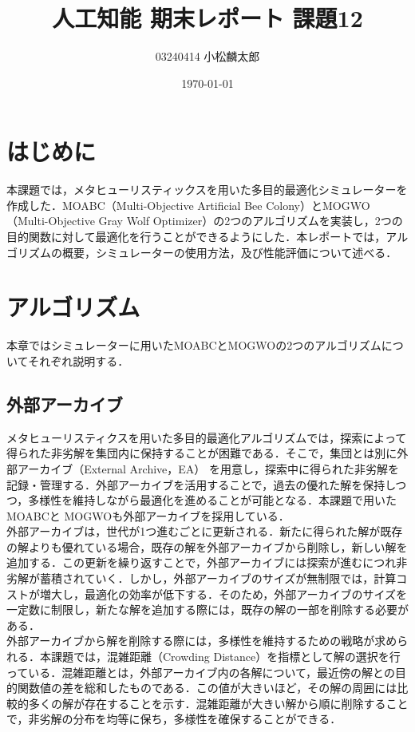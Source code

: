 \documentclass[a4paper, twocolumn]{ltjsarticle}
\title{人工知能 期末レポート 課題12}
\author{03240414  小松麟太郎}
\date{\today}
\begin{document}
\maketitle

\section{はじめに}
本課題では，メタヒューリスティックスを用いた多目的最適化シミュレーターを作成した．MOABC（Multi-Objective Artificial Bee Colony）とMOGWO（Multi-Objective Gray Wolf Optimizer）の2つのアルゴリズムを実装し，2つの目的関数に対して最適化を行うことができるようにした．本レポートでは，アルゴリズムの概要，シミュレーターの使用方法，及び性能評価について述べる．

\section{アルゴリズム}
本章ではシミュレーターに用いたMOABCとMOGWOの2つのアルゴリズムについてそれぞれ説明する．
\subsection{外部アーカイブ}
メタヒューリスティクスを用いた多目的最適化アルゴリズムでは，探索によって得られた非劣解を集団内に保持することが困難である．そこで，集団とは別に外部アーカイブ（External Archive，EA） を用意し，探索中に得られた非劣解を記録・管理する．外部アーカイブを活用することで，過去の優れた解を保持しつつ，多様性を維持しながら最適化を進めることが可能となる．本課題で用いた MOABCと MOGWOも外部アーカイブを採用している．\\\quad
外部アーカイブは，世代が1つ進むごとに更新される．新たに得られた解が既存の解よりも優れている場合，既存の解を外部アーカイブから削除し，新しい解を追加する．この更新を繰り返すことで，外部アーカイブには探索が進むにつれ非劣解が蓄積されていく．しかし，外部アーカイブのサイズが無制限では，計算コストが増大し，最適化の効率が低下する．そのため，外部アーカイブのサイズを一定数に制限し，新たな解を追加する際には，既存の解の一部を削除する必要がある．\\\quad
外部アーカイブから解を削除する際には，多様性を維持するための戦略が求められる．本課題では，混雑距離（Crowding Distance）を指標として解の選択を行っている．混雑距離とは，外部アーカイブ内の各解について，最近傍の解との目的関数値の差を総和したものである．この値が大きいほど，その解の周囲には比較的多くの解が存在することを示す．混雑距離が大きい解から順に削除することで，非劣解の分布を均等に保ち，多様性を確保することができる．
\end{document}
